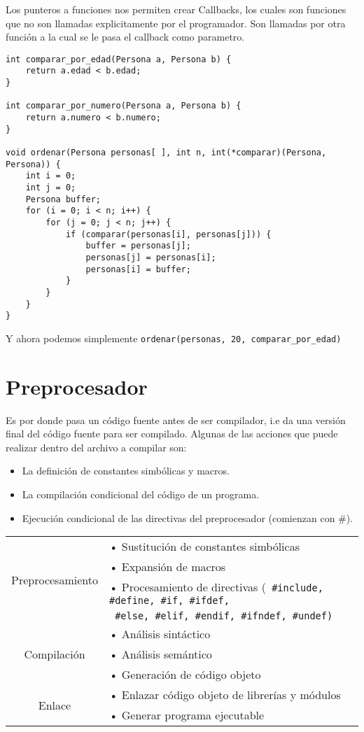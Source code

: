\documentclass[11pt,a4paper]{article}
\begin{document}
Los punteros a funciones nos permiten crear Callbacks, los cuales son funciones que no son llamadas explicitamente por el programador. Son llamadas por otra funci\'on a la cual se le pasa el callback como parametro.

\begin{lstlisting}
int comparar_por_edad(Persona a, Persona b) {
	return a.edad < b.edad;
}

int comparar_por_numero(Persona a, Persona b) {
	return a.numero < b.numero;
}

void ordenar(Persona personas[ ], int n, int(*comparar)(Persona, Persona)) {
	int i = 0;
	int j = 0;
	Persona buffer;
	for (i = 0; i < n; i++) {
		for (j = 0; j < n; j++) {
			if (comparar(personas[i], personas[j])) {
				buffer = personas[j];
				personas[j] = personas[i];
				personas[i] = buffer;
			}
		}
	}
}
\end{lstlisting}

Y ahora podemos simplemente \lstinline!ordenar(personas, 20, comparar_por_edad)!

\section{Preprocesador}
Es por donde pasa un c\'odigo fuente antes de ser compilador, i.e da una versi\'on final del c\'odigo fuente para ser compilado. Algunas de las acciones que puede realizar dentro del archivo a compilar son:

\begin{itemize}
\item La definici\'on de constantes simb\'olicas y macros.
\item La compilaci\'on condicional del c\'odigo de un programa.
\item Ejecuci\'on condicional de las directivas del preprocesador (comienzan con \#).
\end{itemize}

\newpage
\begin{table}[h]
\centering
\begin{tabular}{cl}
\hline
\multirow{4}{*}{Preprocesamiento}
	&• Sustitución de constantes simbólicas\\
    &• Expansión de macros\\
	&• Procesamiento de directivas (\lstinline! #include, #define, #if, #ifdef, !\\
	&  \lstinline! #else, #elif, #endif, #ifndef, #undef)!\\
\hline
\multirow{3}{*}{Compilación}
	&• Análisis sint\'actico\\
    &• An\'alisis sem\'antico\\
    &• Generaci\'on de c\'odigo objeto\\
\hline
\multirow{2}{*}{Enlace}
	&• Enlazar c\'odigo objeto de librer\'ias y m\'odulos\\
    &• Generar programa ejecutable\\
\hline
\end{tabular}
\end{table}
\end{document}
